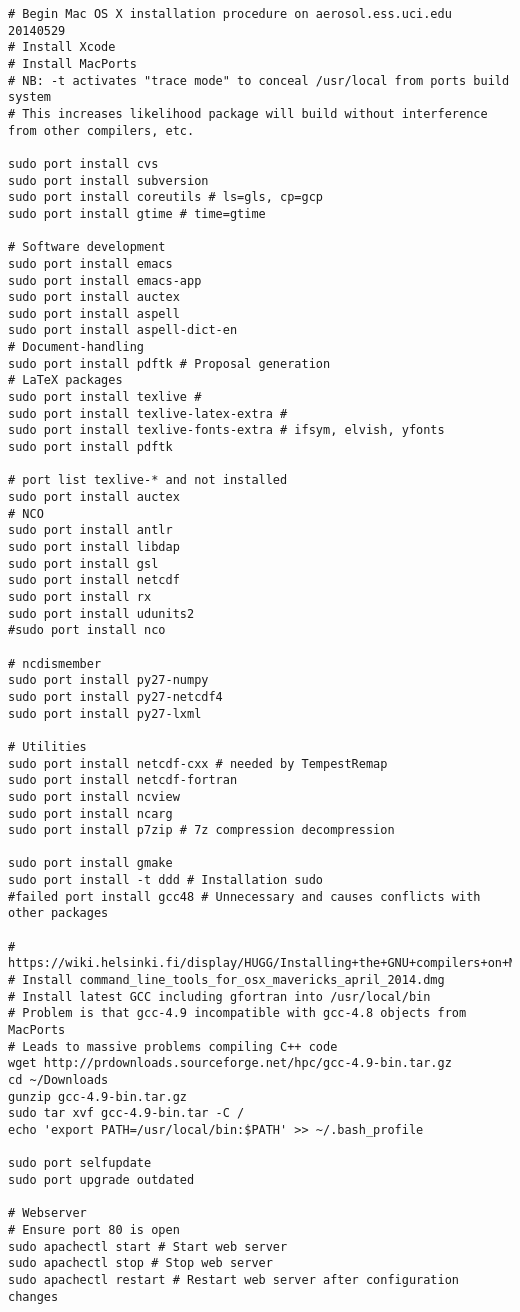 \documentclass[12pt,twoside]{article}
\begin{document}
\begin{verbatim}
# Begin Mac OS X installation procedure on aerosol.ess.uci.edu 20140529
# Install Xcode
# Install MacPorts
# NB: -t activates "trace mode" to conceal /usr/local from ports build system
# This increases likelihood package will build without interference from other compilers, etc.

sudo port install cvs
sudo port install subversion
sudo port install coreutils # ls=gls, cp=gcp
sudo port install gtime # time=gtime

# Software development
sudo port install emacs
sudo port install emacs-app
sudo port install auctex
sudo port install aspell
sudo port install aspell-dict-en
# Document-handling
sudo port install pdftk # Proposal generation
# LaTeX packages
sudo port install texlive # 
sudo port install texlive-latex-extra # 
sudo port install texlive-fonts-extra # ifsym, elvish, yfonts
sudo port install pdftk

# port list texlive-* and not installed
sudo port install auctex
# NCO
sudo port install antlr
sudo port install libdap
sudo port install gsl
sudo port install netcdf
sudo port install rx
sudo port install udunits2
#sudo port install nco

# ncdismember
sudo port install py27-numpy
sudo port install py27-netcdf4
sudo port install py27-lxml

# Utilities
sudo port install netcdf-cxx # needed by TempestRemap
sudo port install netcdf-fortran
sudo port install ncview
sudo port install ncarg
sudo port install p7zip # 7z compression decompression

sudo port install gmake
sudo port install -t ddd # Installation sudo
#failed port install gcc48 # Unnecessary and causes conflicts with other packages

# https://wiki.helsinki.fi/display/HUGG/Installing+the+GNU+compilers+on+Mac+OS+X
# Install command_line_tools_for_osx_mavericks_april_2014.dmg
# Install latest GCC including gfortran into /usr/local/bin
# Problem is that gcc-4.9 incompatible with gcc-4.8 objects from MacPorts
# Leads to massive problems compiling C++ code
wget http://prdownloads.sourceforge.net/hpc/gcc-4.9-bin.tar.gz
cd ~/Downloads
gunzip gcc-4.9-bin.tar.gz
sudo tar xvf gcc-4.9-bin.tar -C /
echo 'export PATH=/usr/local/bin:$PATH' >> ~/.bash_profile

sudo port selfupdate
sudo port upgrade outdated

# Webserver
# Ensure port 80 is open
sudo apachectl start # Start web server
sudo apachectl stop # Stop web server
sudo apachectl restart # Restart web server after configuration changes
\end{verbatim}
\end{document}
